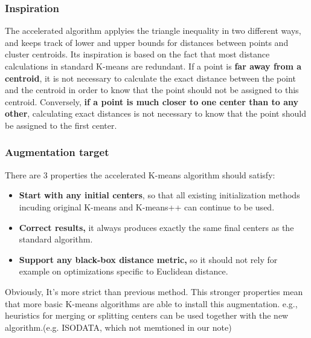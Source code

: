 \documentclass[11pt]{article}
\begin{document}
\subsubsection{Inspiration}
The accelerated algorithm applyies the triangle inequality in two different ways, and keeps track of lower and upper bounds for distances between points and cluster centroids. Its inspiration is based on the fact that most distance calculations in standard K-means are redundant. If a point is \textbf{far away from a centroid}, it is not necessary to calculate the exact distance between the point and the centroid in order to know that the point should not be assigned to this centroid. Conversely, \textbf{if a point is much closer to one center than to any other}, calculating exact distances is not necessary to know that the point should be assigned to the first center. 
\subsubsection{Augmentation target}
There are 3 properties the accelerated K-means algorithm should satisfy:
\begin{itemize}
\item \textbf{Start with any initial centers}, so that all existing initialization methods incuding original K-means and K-means++ can continue to be used.
\item \textbf{Correct results, } it always produces exactly the same final centers as the standard  algorithm.
\item \textbf{Support any black-box distance metric,} so it should not rely for example on optimizations specific to Euclidean distance.
\end{itemize} \par
Obviously, It's more strict than previous method. This stronger properties mean that more basic K-means algorithms are able to install this augmentation. e.g., heuristics for merging or splitting centers can be used together with the new algorithm.(e.g. ISODATA, which not memtioned in our note)
\end{document}

